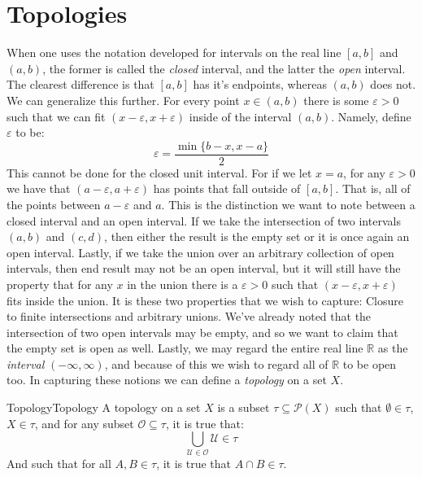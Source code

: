 \section{Topologies}
    When one uses the notation developed for intervals on the real line $[a,b]$
    and $(a,b)$, the former is called the \textit{closed} interval, and the
    latter the \textit{open} interval. The clearest difference is that $[a,b]$
    has it's endpoints, whereas $(a,b)$ does not. We can generalize this
    further. For every point $x\in(a,b)$ there is some $\varepsilon>0$ such that
    we can fit $(x-\varepsilon,x+\varepsilon)$ inside of the interval $(a,b)$.
    Namely, define $\varepsilon$ to be:
    \begin{equation}
        \varepsilon=\frac{\min\{b-x,x-a\}}{2}
    \end{equation}
    This cannot be done for the closed unit interval. For if we let $x=a$, for
    any $\varepsilon>0$ we have that $(a-\varepsilon,a+\varepsilon)$ has points
    that fall outside of $[a,b]$. That is, all of the points between
    $a-\varepsilon$ and $a$. This is the distinction we want to note between a
    closed interval and an open interval. If we take the intersection of two
    intervals $(a,b)$ and $(c,d)$, then either the result is the empty set or it
    is once again an open interval. Lastly, if we take the union over an
    arbitrary collection of open intervals, then end result may not be an open
    interval, but it will still have the property that for any $x$ in the union
    there is a $\varepsilon>0$ such that $(x-\varepsilon,x+\varepsilon)$ fits
    inside the union. It is these two properties that we wish to capture:
    Closure to finite intersections and arbitrary unions. We've already noted
    that the intersection of two open intervals may be empty, and so we want to
    claim that the empty set is open as well. Lastly, we may regard the entire
    real line $\mathbb{R}$ as the \textit{interval} $(\minus\infty,\infty)$, and
    because of this we wish to regard all of $\mathbb{R}$ to be open too. In
    capturing these notions we can define a \textit{topology} on a set $X$.
    \begin{fdefinition}{Topology}{Topology}
        A \gls{topology} on a \gls{set} $X$ is a \gls{subset}
        $\tau\subseteq\mathcal{P}(X)$ such that $\emptyset\in\tau$, $X\in\tau$,
        and for any subset $\mathcal{O}\subseteq\tau$, it is true that:
        \begin{equation*}
            \bigcup_{\mathcal{U}\in\mathcal{O}}\mathcal{U}\in\tau
        \end{equation*}
        And such that for all $A,B\in\tau$, it is true that $A\cap{B}\in\tau$.
    \end{fdefinition}
